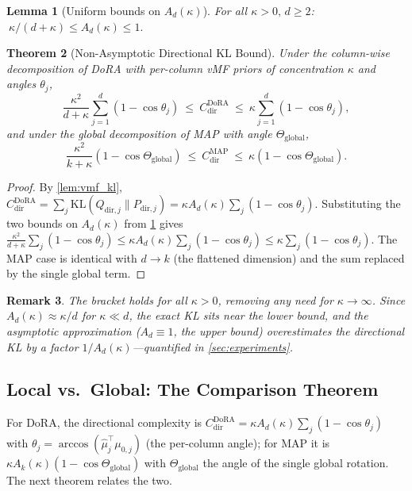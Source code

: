 \documentclass[11pt]{article}
\newtheorem{theorem}{Theorem}[section]
\newtheorem{lemma}[theorem]{Lemma}
\newtheorem{remark}[theorem]{Remark}
\newcommand{\KL}{\mathrm{KL}}
\newcommand{\Ad}{A_d}
\newcommand{\Ak}{A_k}
\newcommand{\Thetaglob}{\Theta_{\mathrm{global}}}
\begin{document}
\begin{lemma}[Uniform bounds on $\Ad(\kappa)$]\label{lem:ad_bounds}
For all $\kappa>0,\,d\ge2$: $\ \kappa/(d+\kappa)\le \Ad(\kappa)\le1.$
\end{lemma}

\setcounter{theorem}{3} %
\begin{theorem}[Non-Asymptotic Directional KL Bound]\label{thm:nonasymptotic}
Under the column-wise decomposition of DoRA with per-column vMF priors of
concentration $\kappa$ and angles $\theta_j$,
\[
\frac{\kappa^2}{d+\kappa}\sum_{j=1}^d(1-\cos\theta_j)
\ \le\ C^{\mathrm{DoRA}}_{\mathrm{dir}}
\ \le\ \kappa\sum_{j=1}^d(1-\cos\theta_j),
\]
and under the global decomposition of MAP with angle $\Thetaglob$,
\[
\frac{\kappa^2}{k+\kappa}(1-\cos\Thetaglob)
\ \le\ C^{\mathrm{MAP}}_{\mathrm{dir}}
\ \le\ \kappa(1-\cos\Thetaglob).
\]
\end{theorem}
\begin{proof}
By \cref{lem:vmf_kl}, $C^{\mathrm{DoRA}}_{\mathrm{dir}}=\sum_{j}\KL(Q_{\mathrm{dir},j}\|P_{\mathrm{dir},j})
=\kappa \Ad(\kappa)\sum_j(1-\cos\theta_j)$. Substituting the two bounds on $\Ad(\kappa)$
from \cref{lem:ad_bounds} gives
$\frac{\kappa^2}{d+\kappa}\sum_j(1-\cos\theta_j)\le\kappa \Ad(\kappa)\sum_j(1-\cos\theta_j)\le\kappa\sum_j(1-\cos\theta_j)$.
The MAP case is identical with $d\!\to\!k$ (the flattened dimension) and the sum
replaced by the single global term.
\end{proof}

\begin{remark}\label{rem:nonasym}
The bracket holds for all $\kappa>0$, removing any need for $\kappa\to\infty$. Since
$\Ad(\kappa)\approx\kappa/d$ for $\kappa\ll d$, the exact KL sits near the lower bound,
and the asymptotic approximation ($\Ad\!\equiv\!1$, the upper bound) overestimates the
directional KL by a factor $1/\Ad(\kappa)$---quantified in \cref{sec:experiments}.
\end{remark}

\subsection{Local vs.\ Global: The Comparison Theorem}
\label{sec:comparison}
For DoRA, the directional complexity is $C^{\mathrm{DoRA}}_{\mathrm{dir}}=\kappa \Ad(\kappa)\sum_j(1-\cos\theta_j)$
with $\theta_j=\arccos(\hat\mu_j^\top\mu_{0,j})$ (the per-column angle); for MAP it is
$\kappa \Ak(\kappa)(1-\cos\Thetaglob)$ with $\Thetaglob$ the angle of the single global
rotation. The next theorem relates the two.
\end{document}
